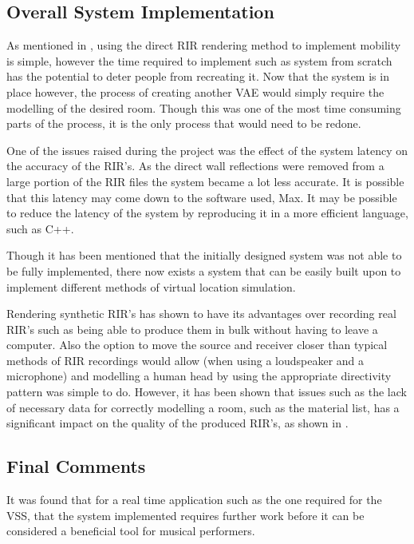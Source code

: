 \documentclass[../../main.tex]{subfiles}
\begin{document}




		\subsection{Overall System Implementation}
			 As mentioned in , using the direct \ac{RIR} rendering method to implement mobility is simple, however the time required to implement such as system from scratch has the potential to deter people from recreating it. Now that the system is in place however, the process of creating another \ac{VAE} would simply require the modelling of the desired room. Though this was one of the most time consuming parts of the process, it is the only process that would need to be redone.

			 One of the issues raised during the project was the effect of the system latency on the accuracy of the \ac{RIR}'s. As the direct wall reflections were removed from a large portion of the \ac{RIR} files the system became a lot less accurate. It is possible that this latency may come down to the software used, Max. It may be possible to reduce the latency of the system by reproducing it in a more efficient language, such as C++.

			Though it has been mentioned that the initially designed system was not able to be fully implemented, there now exists a system that can be easily built upon to implement different methods of virtual location simulation.

			Rendering synthetic \ac{RIR}'s has shown to have its advantages over recording real \ac{RIR}'s such as being able to produce them in bulk without having to leave a computer. Also the option to move the source and receiver closer than typical methods of \ac{RIR} recordings would allow (when using a loudspeaker and a microphone) and modelling a human head by using the appropriate directivity pattern was simple to do. However, it has been shown that issues such as the lack of necessary data for correctly modelling a room, such as the material list, has a significant impact on the quality of the produced \ac{RIR}'s, as shown in .

		\subsection{Final Comments}
			It was found that for a real time application such as the one required for the VSS, that the system implemented requires further work before it can be considered a beneficial tool for musical performers.
\end{document}
